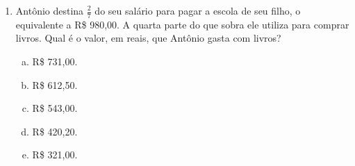 \documentclass[a4paper,14pt]{article}
\begin{document}
\begin{multicols}{2}
\begin{enumerate}
   			\item Antônio destina $\frac{2}{7}$ do seu salário para pagar a escola de seu filho, o equivalente a R\$ 980,00. A quarta parte do que sobra ele utiliza para comprar livros. Qual é o valor, em reais, que Antônio gasta com livros?
   			\begin{enumerate}[a)]
   				\item R\$ 731,00.
   				\item R\$ 612,50.
   				\item R\$ 543,00.
   				\item R\$ 420,20.
   				\item R\$ 321,00.
   			\end{enumerate}
    	\end{enumerate}
    $~$ \\ $~$ \\ $~$ \\ $~$ \\ $~$ \\ $~$ \\ $~$ \\ $~$ \\ $~$ \\ $~$
	\end{multicols}
\end{document}
